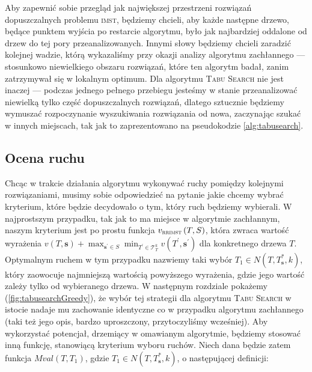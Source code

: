 Aby zapewnić sobie przegląd jak największej przestrzeni rozwiązań dopuszczalnych problemu \textsc{imst}, będziemy chcieli, aby każde następne drzewo, będące punktem wyjścia po restarcie algorytmu, było jak najbardziej oddalone od drzew do tej pory przeanalizowanych. Innymi słowy będziemy chcieli zaradzić kolejnej wadzie, którą wykazaliśmy przy okazji analizy algorytmu zachłannego --- stosunkowo niewielkiego obszaru rozwiązań, które ten algorytm badał, zanim zatrzymywał się w lokalnym optimum. Dla algorytmu \textsc{Tabu Search} nie jest inaczej --- podczas jednego pełnego przebiegu jesteśmy w stanie przeanalizować niewielką tylko część dopuszczalnych rozwiązań, dlatego sztucznie będziemy wymuszać rozpoczynanie wyszukiwania rozwiązania od nowa, zaczynając szukać w innych miejscach, tak jak to zaprezentowano na pseudokodzie \ref{alg:tabusearch}.

\subsection{Ocena ruchu}

Chcąc w trakcie działania algorytmu wykonywać ruchy pomiędzy kolejnymi rozwiązaniami, musimy sobie odpowiedzieć na pytanie jakie chcemy wybrać kryterium, które będzie decydowało o tym, który ruch będziemy wybierali. W najprostszym przypadku, tak jak to ma miejsce w algorytmie zachłannym, naszym kryterium jest po prostu funkcja $v_{\textsc{rrimst}} \left( T, S \right)$, która zwraca wartość wyrażenia $v \left( T, \textbf{s} \right) + \max_{\textbf{s}^{\prime} \in S} \min_{T^{\prime} \in \mathcal{T}^{k}_{T}} v \left( T^{\prime}, \textbf{s}^{\prime} \right)$ dla konkretnego drzewa $T$. Optymalnym ruchem w tym przypadku nazwiemy taki wybór $T_{1} \in N \left( T, T^{\ast}_{\textbf{s}}, k \right)$, który zaowocuje najmniejszą wartością powyższego wyrażenia, gdzie jego wartość zależy tylko od wybieranego drzewa. W następnym rozdziale pokażemy (\ref{fig:tabusearchGreedy}), że wybór tej strategii dla algorytmu \textsc{Tabu Search} w istocie nadaje mu zachowanie identyczne co w przypadku algorytmu zachłannego (taki też jego opis, bardzo uproszczony, przytoczyliśmy wcześniej). Aby wykorzystać potencjał, drzemiący w omawianym algorytmie, będziemy stosować inną funkcję, stanowiącą kryterium wyboru ruchów. Niech dana będzie zatem funkcja $Mval \left( T, T_{1} \right)$, gdzie $T_{1} \in N \left( T, T^{\ast}_{\textbf{s}}, k \right)$, o następującej definicji:

